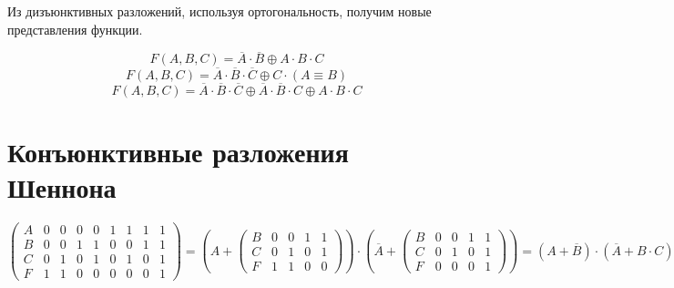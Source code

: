 \documentclass[a4paper,10pt]{article} %
\begin{document}
	Из дизъюнктивных разложений, используя ортогональность, получим новые представления функции.
	
	\begin{equation}
		F(A, B, C) = \overline{A} \cdot \overline{B} \oplus A \cdot B \cdot C
	\end{equation}
	\begin{equation}
		F(A, B, C) = \overline{A} \cdot \overline{B} \cdot \overline{C} 
		\oplus C \cdot (A \equiv B) 
	\end{equation}
	\begin{equation}
		F(A, B, C) = \overline{A} \cdot \overline{B} \cdot \overline{C} \oplus
		\overline{A} \cdot \overline{B} \cdot C \oplus
		A \cdot B \cdot C 
	\end{equation}
	
	\section{Конъюнктивные разложения Шеннона}
	
	\begin{equation}
		\left(
		\begin{smallmatrix}
			A & 0 & 0 & 0 & 0 & 1 & 1 & 1 & 1 \\
			B & 0 & 0 & 1 & 1 & 0 & 0 & 1 & 1 \\
			C & 0 & 1 & 0 & 1 & 0 & 1 & 0 & 1 \\
			F & 1 & 1 & 0 & 0 & 0 & 0 & 0 & 1
		\end{smallmatrix}
		\right)
		= \left(A + 
		\left(
		\begin{smallmatrix}
			B & 0 & 0 & 1 & 1 \\
			C & 0 & 1 & 0 & 1 \\
			F & 1 & 1 & 0 & 0
		\end{smallmatrix}
		\right)
		\right) \cdot \left( \overline{A} + 
		\left(
		\begin{smallmatrix}
			B & 0 & 0 & 1 & 1 \\
			C & 0 & 1 & 0 & 1 \\
			F & 0 & 0 & 0 & 1
		\end{smallmatrix}
		\right)
		\right) = (A + \overline{B}) \cdot (\overline{A} + B \cdot C)
	\end{equation}
	
\end{document}
